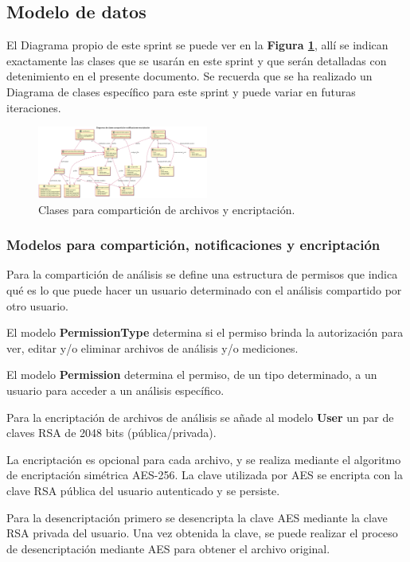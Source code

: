 \subsection{Modelo de datos}
El Diagrama propio de este sprint se puede ver en la \textbf{Figura \ref{8-clases_compartición_encriptación}}, allí se indican exactamente las clases que se usarán en este sprint y que serán detalladas con detenimiento en el presente documento. Se recuerda que se ha realizado un Diagrama de clases específico para este sprint y puede variar en futuras iteraciones.

    \begin{figure}[h]
        \centering
        \includegraphics[width=0.5\textwidth]{img/dc_sprint8}
        \caption{Clases para compartición de archivos y encriptación.}
		\label{8-clases_compartición_encriptación}
    \end{figure}

\subsubsection{Modelos para compartición, notificaciones y encriptación}

Para la compartición de análisis se define una estructura de permisos que indica qué es lo que puede hacer un usuario determinado con el análisis compartido por otro usuario.

El modelo \textbf{PermissionType} determina si el permiso brinda la autorización para ver, editar y/o eliminar archivos de análisis y/o mediciones.

El modelo \textbf{Permission} determina el permiso, de un tipo determinado, a un usuario para acceder a un análisis específico.

Para la encriptación de archivos de análisis se añade al modelo \textbf{User} un par de claves RSA de 2048 bits (pública/privada).

La encriptación es opcional para cada archivo, y se realiza mediante el algoritmo de encriptación simétrica AES-256. La clave utilizada por AES se encripta con la clave RSA pública del usuario autenticado y se persiste.

Para la desencriptación primero se desencripta la clave AES mediante la clave RSA privada del usuario. Una vez obtenida la clave, se puede realizar el proceso de desencriptación mediante AES para obtener el archivo original.

